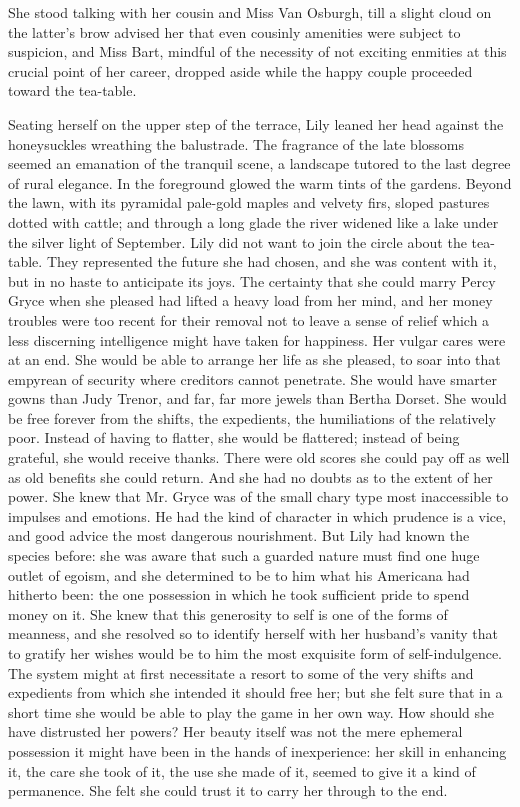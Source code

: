 \documentclass[12pt,a4paper]{book}
\begin{document}
She stood talking with her cousin and Miss Van Osburgh, till a
slight cloud on the latter's brow advised her that even cousinly
amenities were subject to suspicion, and Miss Bart, mindful of
the necessity of not exciting enmities at this crucial point of
her career, dropped aside while the happy couple proceeded toward
the tea-table.





Seating herself on the upper step of the terrace, Lily leaned her
head against the honeysuckles wreathing the balustrade. The
fragrance of the late blossoms seemed an emanation of the
tranquil scene, a landscape tutored to the last degree of rural
elegance. In the foreground glowed the warm tints of the gardens. 
Beyond the lawn, with its pyramidal pale-gold maples and velvety
firs, sloped pastures dotted with cattle; and through a long
glade the river widened like a lake under the silver light of
September. Lily did not want to join the circle about the
tea-table. They represented the future she had chosen, and she
was content with it, but in no haste to anticipate its joys. The
certainty that she could marry Percy Gryce when she pleased had
lifted a heavy load from her mind, and her money troubles were
too recent for their removal not to leave a sense of
relief which a less discerning intelligence might have taken for
happiness. Her vulgar cares were at an end. She would be able to
arrange her life as she pleased, to soar into that empyrean of
security where creditors cannot penetrate. She would have smarter
gowns than Judy Trenor, and far, far more jewels than Bertha
Dorset. She would be free forever from the shifts, the
expedients, the humiliations of the relatively poor. Instead of
having to flatter, she would be flattered; instead of being
grateful, she would receive thanks. There were old scores she
could pay off as well as old benefits she could return. And she
had no doubts as to the extent of her power. She knew that Mr.
Gryce was of the small chary type most inaccessible to impulses
and emotions. He had the kind of character in which prudence is a
vice, and good advice the most dangerous nourishment. But Lily
had known the species before: she was aware that such a guarded
nature must find one huge outlet of egoism, and she determined to
be to him what his Americana had hitherto been: the one
possession in which he took sufficient pride to spend money on
it. She knew that this generosity to self is one of the forms of
meanness, and she resolved so to identify herself with her
husband's vanity that to gratify her wishes would be to him the
most exquisite form of self-indulgence. The system might at first
necessitate a resort to some of the very shifts and expedients
from which she intended it should free her; but she felt sure
that in a short time she would be able to play the game in her
own way. How should she have distrusted her powers? Her beauty
itself was not the mere ephemeral possession it might have been
in the hands of inexperience: her skill in enhancing it, the care
she took of it, the use she made of it, seemed to give it a kind
of permanence. She felt she could trust it to carry her through
to the end.
\end{document}
